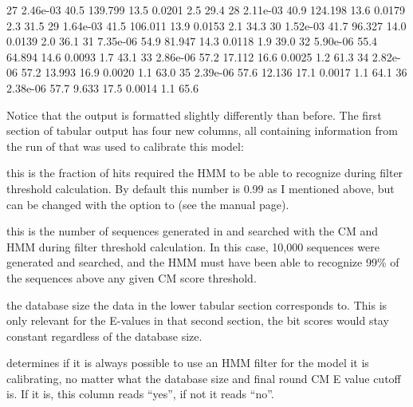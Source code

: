 \begin{sreoutput}
          27    2.46e-03    40.5     139.799    13.5  0.0201      2.5     29.4
          28    2.11e-03    40.9     124.198    13.6  0.0179      2.3     31.5
          29    1.64e-03    41.5     106.011    13.9  0.0153      2.1     34.3
          30    1.52e-03    41.7      96.327    14.0  0.0139      2.0     36.1
          31    7.35e-06    54.9      81.947    14.3  0.0118      1.9     39.0
          32    5.90e-06    55.4      64.894    14.6  0.0093      1.7     43.1
          33    2.86e-06    57.2      17.112    16.6  0.0025      1.2     61.3
          34    2.82e-06    57.2      13.993    16.9  0.0020      1.1     63.0
          35    2.39e-06    57.6      12.136    17.1  0.0017      1.1     64.1
          36    2.38e-06    57.7       9.633    17.5  0.0014      1.1     65.6
\end{sreoutput}

Notice that the output is formatted slightly differently than
before. The first section of tabular output has four new columns, all
containing information from the run of  that was
used to calibrate this model: 

\begin{wideitem}

\item[\emprog{F}] this is the fraction of hits 
  required the HMM to be able to recognize during filter threshold
  calculation. By default this number is 0.99 as I mentioned above,
  but can be changed with the  option to 
  (see the manual page).

\item[\emprog{nseq}] this is the number of sequences generated in 
  and searched with the CM and HMM during filter threshold
  calculation. In this case, 10,000 sequences were generated and
  searched, and the HMM must have been able to recognize 99\% of the
  sequences above any given CM score threshold. 

\item[\emprog{db (Mb)}] the database size the data in the lower
  tabular section corresponds to. This is only relevant for the
  E-values in that second section, the bit scores would stay constant
  regardless of the database size.

\item[\emprog{always?}]  determines if it is always
  possible to use an HMM filter for the model it is calibrating, no
  matter what the database size and final round CM E value cutoff
  is. If it is, this column reads ``yes'', if not it reads ``no''.
\end{wideitem}

